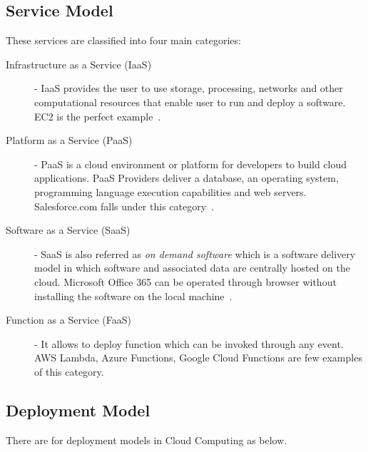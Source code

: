 \subsection{Service Model} These services are classified into four 
main categories: 

\begin{description}

\item[Infrastructure as a Service (IaaS)] - IaaS provides the user
to use storage, processing, networks and other computational resources
that enable user to run and deploy a software. EC2 is the perfect
example~\cite{hid-sp18-513-cloud2}. 

\item[Platform as a Service (PaaS)] - PaaS is a cloud environment or
platform for developers to build cloud applications. PaaS Providers
deliver a database, an operating system, programming language execution
capabilities and web servers. Salesforce.com falls under this 
category~\cite{hid-sp18-513-cloud2}.  

\item[Software as a Service (SaaS)] - SaaS is also referred as
\emph{on demand software} which is a software delivery model in which 
software and associated data are centrally hosted on the cloud. 
Microsoft Office 365 can be operated through browser without 
installing the software on the local machine~\cite{hid-sp18-513-cloud2}. 

\item[Function as a Service (FaaS)] - It allows to deploy function which 
can be invoked through any event. AWS Lambda, Azure Functions, Google 
Cloud Functions are few examples of this category.
\end{description}

\subsection{Deployment Model} There are for deployment models in Cloud
Computing as below.

